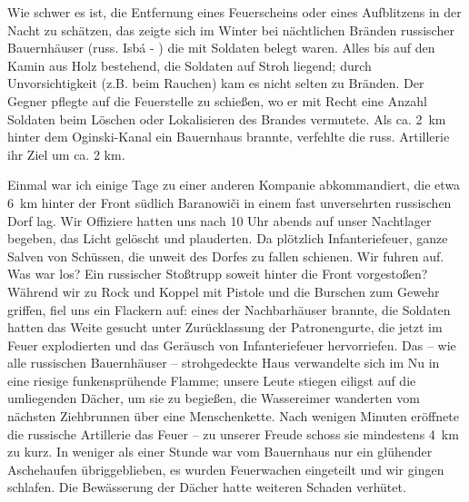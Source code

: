 Wie schwer es ist, die Entfernung eines Feuerscheins oder eines Aufblitzens in der Nacht zu schätzen, das zeigte sich im Winter bei nächtlichen Bränden russischer Bauernhäuser (russ. Isbá - ) die mit Soldaten belegt waren. Alles bis auf den Kamin aus Holz bestehend, die Soldaten auf Stroh liegend; durch Unvorsichtigkeit (z.B. beim Rauchen) kam es nicht selten zu Bränden. Der Gegner pflegte auf die Feuerstelle zu schießen, wo er mit Recht eine Anzahl Soldaten beim Löschen oder Lokalisieren des Brandes vermutete. Als ca. 2~km hinter dem Oginski-Kanal ein Bauernhaus brannte, verfehlte die russ. Artillerie ihr Ziel um ca. 2 km.

Einmal war ich einige Tage zu einer anderen Kompanie abkommandiert, die etwa 6~km hinter der Front südlich Baranowiči in einem fast unversehrten russischen Dorf lag. Wir Offiziere hatten uns nach 10 Uhr abends auf unser Nachtlager begeben, das Licht gelöscht und plauderten. Da plötzlich Infanteriefeuer, ganze Salven von Schüssen, die unweit des Dorfes zu fallen schienen. Wir fuhren auf. Was war los? Ein russischer Stoßtrupp soweit hinter die Front vorgestoßen? Während wir zu Rock und Koppel mit Pistole und die Burschen zum Gewehr griffen, fiel uns ein Flackern auf: eines der Nachbarhäuser brannte, die Soldaten hatten das Weite gesucht unter Zurücklassung der Patronengurte, die jetzt im Feuer explodierten und das Geräusch von Infanteriefeuer hervorriefen. Das -- wie alle russischen Bauernhäuser -- strohgedeckte Haus verwandelte sich im Nu in eine riesige funkensprühende Flamme; unsere Leute stiegen eiligst auf die umliegenden Dächer, um sie zu begießen, die Wassereimer wanderten vom nächsten Ziehbrunnen über eine Menschenkette. Nach wenigen Minuten eröffnete die russische Artillerie das Feuer -- zu unserer Freude schoss sie mindestens 4~km zu kurz. In weniger als einer Stunde war vom Bauernhaus nur ein glühender Aschehaufen übriggeblieben, es wurden Feuerwachen eingeteilt und wir gingen schlafen. Die Bewässerung der Dächer hatte weiteren Schaden verhütet.

